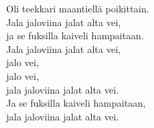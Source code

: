 
Oli teekkari maantiellä poikittain. \\ Jala jaloviina jalat alta vei, \\ ja se fuksilla kaiveli hampaitaan. \\ Jala jaloviina jalat alta vei, \\ jalo vei, \\ jalo vei, \\ jala jaloviina jalat alta vei. \\ Ja se fuksilla kaiveli hampaitaan, \\ jala jaloviina jalat alta vei.